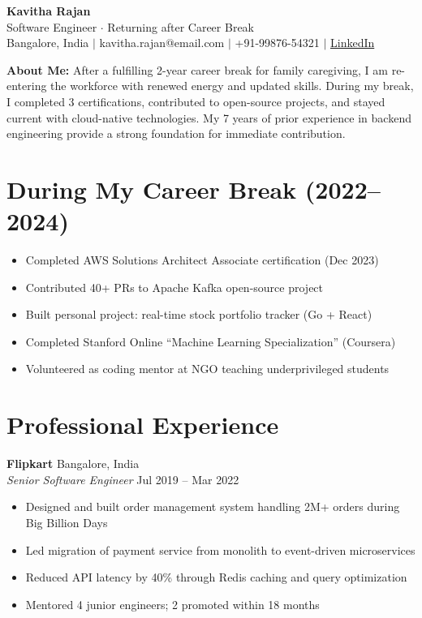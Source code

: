 \documentclass[11pt,letterpaper]{article}
\begin{document}
\begin{center}
{\LARGE\bfseries Kavitha Rajan}\\[6pt]
{\small Software Engineer \quad $\cdot$ \quad Returning after Career Break}\\[4pt]
{\footnotesize Bangalore, India \quad $\vert$ \quad kavitha.rajan@email.com \quad $\vert$ \quad +91-99876-54321 \quad $\vert$ \quad \href{https://linkedin.com/in/kavitharajan}{LinkedIn}}
\end{center}

\vspace{8pt}
\begin{tcolorbox}
\textbf{About Me:} After a fulfilling 2-year career break for family caregiving, I am re-entering the workforce with renewed energy and updated skills. During my break, I completed 3 certifications, contributed to open-source projects, and stayed current with cloud-native technologies. My 7 years of prior experience in backend engineering provide a strong foundation for immediate contribution.
\end{tcolorbox}

\section{During My Career Break (2022--2024)}
\begin{itemize}
\item Completed AWS Solutions Architect Associate certification (Dec 2023)
\item Contributed 40+ PRs to Apache Kafka open-source project
\item Built personal project: real-time stock portfolio tracker (Go + React)
\item Completed Stanford Online ``Machine Learning Specialization'' (Coursera)
\item Volunteered as coding mentor at NGO teaching underprivileged students
\end{itemize}

\section{Professional Experience}

\textbf{Flipkart} \hfill Bangalore, India\\
\textit{Senior Software Engineer} \hfill Jul 2019 -- Mar 2022
\begin{itemize}
\item Designed and built order management system handling 2M+ orders during Big Billion Days
\item Led migration of payment service from monolith to event-driven microservices
\item Reduced API latency by 40\% through Redis caching and query optimization
\item Mentored 4 junior engineers; 2 promoted within 18 months
\end{itemize}
\end{document}
